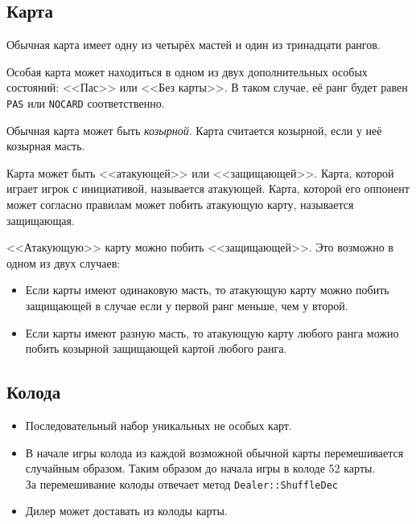 \documentclass[a4paper,12pt]{article}
\begin{document}
        \subsection{Карта}
            \begin{itemize}
                \item[] Обычная карта имеет одну из четырёх мастей и один из тринадцати рангов.
                \item[] Особая карта может находиться в одном из двух дополнительных особых состояний: <<Пас>> или <<Без карты>>.
                        В таком случае, её ранг будет равен \texttt{PAS} или \texttt{NOCARD} соответственно.
                \item[] Обычная карта может быть \textit{козырной}.
                        Карта считается козырной, если у неё козырная масть.
                \hypertarget{hit_rule}{
                \item[] Карта может быть <<атакующей>> или <<защищающей>>.
                        Карта, которой играет игрок с инициативой, называется атакующей.
                        Карта, которой его оппонент может согласно правилам может
                        побить атакующую карту, называется защищающая.
                \item[] <<Атакующую>> карту можно побить <<защищающей>>. Это возможно в одном из двух случаев:
                }
                \begin{itemize} 
                    \item Если карты имеют одинаковую масть, то атакующую карту можно побить защищающей в случае если у первой ранг меньше, чем у второй.
                    \item Если карты имеют разную масть, то атакующую карту любого ранга можно побить козырной защищающей картой любого ранга.
                \end{itemize}
            \end{itemize}

        \subsection{Колода}
            \begin{itemize}
                \item[] Последовательный набор уникальных не особых карт.
                \item[] В начале игры колода из каждой возможной обычной карты перемешивается случайным образом.
                        Таким образом до начала игры в колоде 52 карты.\\
                        За перемешивание колоды отвечает метод \texttt{Dealer::ShuffleDec}
                \item[] Дилер может доставать из колоды карты.
            \end{itemize}
\end{document}
